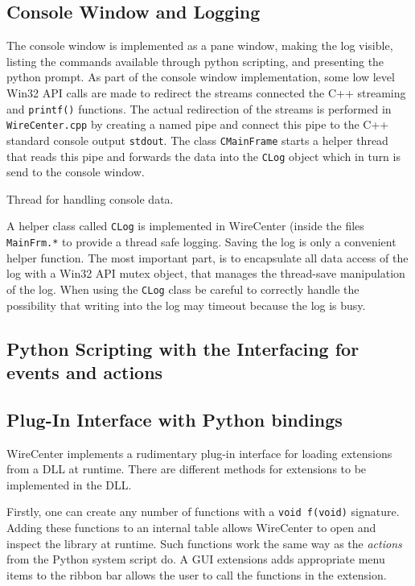 \documentclass[11pt,a4paper,onepage,openany]{book}
\begin{document}
\subsection{Console Window and Logging}
The console window is implemented as a pane window, making the log visible,
listing the commands available through python scripting, and presenting the
python prompt. As part of the console window implementation, some low level
Win32 API calls are made to redirect the streams connected the C++ streaming
and \texttt{printf()} functions. The actual redirection of the streams is
performed in \texttt{WireCenter.cpp} by creating a named pipe and connect this
pipe to the C++ standard console output \texttt{stdout}. The class
\texttt{CMainFrame} starts a helper thread that reads this pipe and forwards
the data into the \texttt{CLog} object which in turn is send to the console
window.

Thread for handling console data.

A helper class called \texttt{CLog} is implemented in WireCenter (inside the
files \texttt{MainFrm.*} to provide a thread safe logging. Saving the log is
only a convenient helper function. The most important part, is to encapsulate
all data access of the log with a Win32 API mutex object, that manages the
thread-save manipulation of the log. When using the \texttt{CLog} class be
careful to correctly handle the possibility that writing into the log may
timeout because the log is busy.

\subsection{Python Scripting with the Interfacing for events and actions}

\subsection{Plug-In Interface with Python bindings}
WireCenter implements a rudimentary plug-in interface for loading extensions
from a DLL at runtime. There are different methods for extensions to be
implemented in the DLL.

Firstly, one can create any number of functions with a \texttt{void f(void)}
signature. Adding these functions to an internal table allows WireCenter to
open and inspect the library at runtime. Such functions work the same way as
the \emph{actions} from the Python system script do. A GUI extensions adds
appropriate menu items to the ribbon bar allows the user to call the functions
in the extension.
\end{document}
